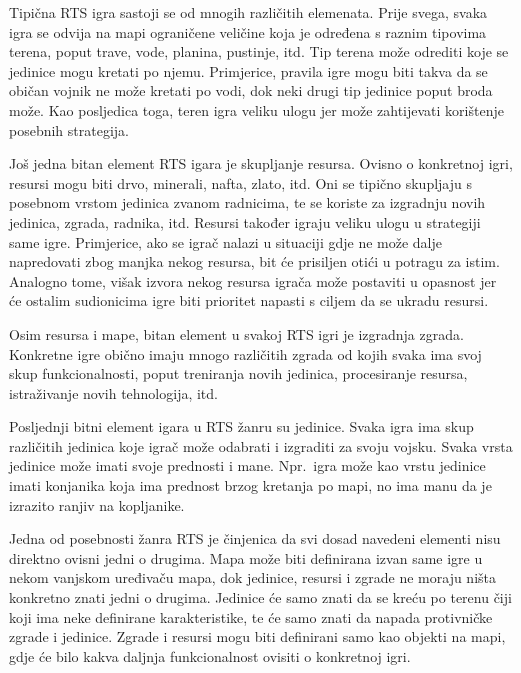 \documentclass[times, utf8, zavrsni, numeric]{fer}
\begin{document}
\par Tipična RTS igra sastoji se od mnogih različitih elemenata.
Prije svega, svaka igra se odvija na mapi ograničene veličine koja je određena s raznim tipovima terena, poput trave, vode, planina, pustinje, itd. 
Tip terena može odrediti koje se jedinice mogu kretati po njemu.
Primjerice, pravila igre mogu biti takva da se običan vojnik ne može kretati po vodi, dok neki drugi tip jedinice poput broda može.
Kao posljedica toga, teren igra veliku ulogu jer može zahtijevati korištenje posebnih strategija.

\par Još jedna bitan element RTS igara je skupljanje resursa.
Ovisno o konkretnoj igri, resursi mogu biti drvo, minerali, nafta, zlato, itd. Oni se tipično skupljaju s posebnom vrstom jedinica zvanom radnicima, te se koriste za izgradnju novih jedinica, zgrada, radnika, itd.
Resursi također igraju veliku ulogu u strategiji same igre.
Primjerice, ako se igrač nalazi u situaciji gdje ne može dalje napredovati zbog manjka nekog resursa, bit će prisiljen otići u potragu za istim.
Analogno tome, višak izvora nekog resursa igrača može postaviti u opasnost jer će ostalim sudionicima igre biti prioritet napasti s ciljem da se ukradu resursi.

\par Osim resursa i mape, bitan element u svakoj RTS igri je izgradnja zgrada. 
Konkretne igre obično imaju mnogo različitih zgrada od kojih svaka ima svoj skup funkcionalnosti, poput treniranja novih jedinica, procesiranje resursa, istraživanje novih tehnologija, itd.  

\par Posljednji bitni element igara u RTS žanru su jedinice. 
Svaka igra ima skup različitih jedinica koje igrač može odabrati i izgraditi za svoju vojsku.
Svaka vrsta jedinice može imati svoje prednosti i mane.
Npr.\ igra može kao vrstu jedinice imati konjanika koja ima prednost brzog kretanja po mapi, no ima manu da je izrazito ranjiv na kopljanike.

\par Jedna od posebnosti žanra RTS je činjenica da svi dosad navedeni elementi nisu direktno ovisni jedni o drugima.
Mapa može biti definirana izvan same igre u nekom vanjskom uređivaču mapa, dok jedinice, resursi i zgrade ne moraju ništa konkretno znati jedni o drugima.
Jedinice će samo znati da se kreću po terenu čiji koji ima neke definirane karakteristike, te će samo znati da napada protivničke zgrade i jedinice. 
Zgrade i resursi mogu biti definirani samo kao objekti na mapi, gdje će bilo kakva daljnja funkcionalnost ovisiti o konkretnoj igri.
\end{document}
